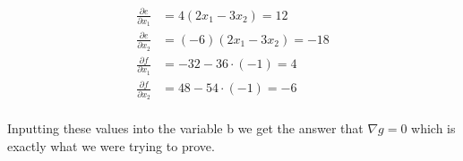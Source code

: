 \documentclass{article}
\begin{document}
\begin{align*}
\frac{\partial e}{\partial x_1}&=4(2x_1-3x_2)=12\\
  \frac{\partial e}{\partial x_2}&=(-6)(2x_1-3x_2)=-18\\
\frac{\partial f}{\partial x_1}&=-32-36\cdot(-1)=4\\
\frac{\partial f}{\partial x_2}&=48-54\cdot(-1)=-6\\
\end{align*}

Inputting these values into the variable b we get the answer that $\nabla g =
0$ which is exactly what we were trying to prove.
\end{document}
